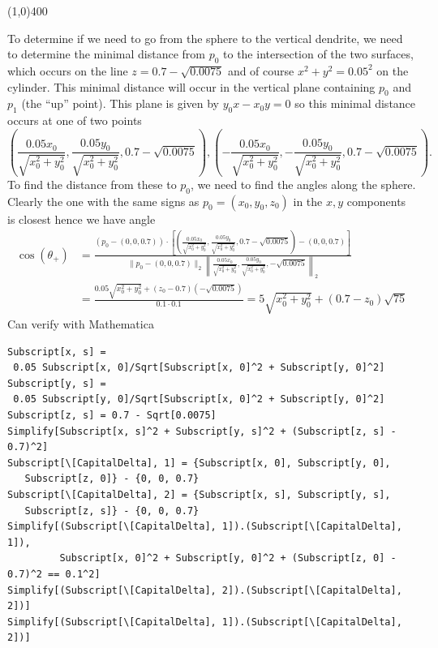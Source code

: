 \documentclass[a4paper,10pt]{article}
\begin{document}
\begin{center}
\line(1,0){400}
\end{center}

To determine if we need to go from the sphere to the vertical dendrite, we
need to determine the minimal distance from \(p_0\) to the intersection of
the two surfaces, which occurs on the line \(z = 0.7 - \sqrt{0.0075}\) and
of course \(x^2 + y^2 = 0.05^2\) on the cylinder. This minimal distance
will occur in the vertical plane containing \(p_0\) and \(p_1\) (the ``up''
point). This plane is given by \(y_0 x - x_0 y = 0\) so this minimal distance
occurs at one of two points
\[\left(\frac{0.05 x_0}{\sqrt{x_0^2 + y_0^2}},
\frac{0.05 y_0}{\sqrt{x_0^2 + y_0^2}}, 0.7 - \sqrt{0.0075}\right),
\left(-\frac{0.05 x_0}{\sqrt{x_0^2 + y_0^2}},
-\frac{0.05 y_0}{\sqrt{x_0^2 + y_0^2}}, 0.7 - \sqrt{0.0075}\right).\]
To find the distance from these to \(p_0\), we need to find the angles along
the sphere. Clearly the one with the same signs as \(p_0 = (x_0, y_0, z_0)\)
in the \(x, y\) components is closest hence we have angle
\begin{align*}
\cos \left(\theta_+\right) &= \frac{(p_0 - (0, 0, 0.7)) \cdot
\left[\left(\frac{0.05 x_0}{\sqrt{x_0^2 + y_0^2}},
\frac{0.05 y_0}{\sqrt{x_0^2 + y_0^2}}, 0.7 - \sqrt{0.0075}\right) -
(0, 0, 0.7)\right]}{\|p_0 -
(0, 0, 0.7)\|_2 \left\lVert\frac{0.05 x_0}{\sqrt{x_0^2 + y_0^2}},
\frac{0.05 y_0}{\sqrt{x_0^2 + y_0^2}}, - \sqrt{0.0075}\right\rVert_2} \\
&= \frac{0.05 \sqrt{x_0^2 + y_0^2} + (z_0 - 0.7)(- \sqrt{0.0075})}{0.1 \cdot 0.1}
= 5 \sqrt{x_0^2 + y_0^2} + (0.7 - z_0)\sqrt{75}
\end{align*}
Can verify with Mathematica
\begin{verbatim}
Subscript[x, s] =
 0.05 Subscript[x, 0]/Sqrt[Subscript[x, 0]^2 + Subscript[y, 0]^2]
Subscript[y, s] =
 0.05 Subscript[y, 0]/Sqrt[Subscript[x, 0]^2 + Subscript[y, 0]^2]
Subscript[z, s] = 0.7 - Sqrt[0.0075]
Simplify[Subscript[x, s]^2 + Subscript[y, s]^2 + (Subscript[z, s] - 0.7)^2]
Subscript[\[CapitalDelta], 1] = {Subscript[x, 0], Subscript[y, 0],
   Subscript[z, 0]} - {0, 0, 0.7}
Subscript[\[CapitalDelta], 2] = {Subscript[x, s], Subscript[y, s],
   Subscript[z, s]} - {0, 0, 0.7}
Simplify[(Subscript[\[CapitalDelta], 1]).(Subscript[\[CapitalDelta], 1]),
         Subscript[x, 0]^2 + Subscript[y, 0]^2 + (Subscript[z, 0] - 0.7)^2 == 0.1^2]
Simplify[(Subscript[\[CapitalDelta], 2]).(Subscript[\[CapitalDelta], 2])]
Simplify[(Subscript[\[CapitalDelta], 1]).(Subscript[\[CapitalDelta], 2])]
\end{verbatim}
\end{document}
